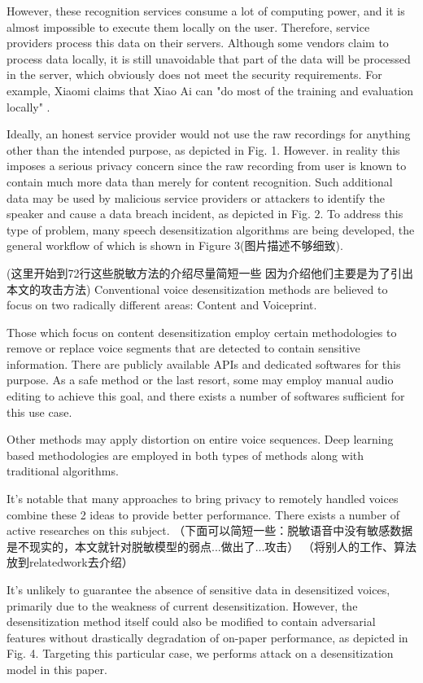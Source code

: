 \documentclass[journal]{IEEEtran} %
\begin{document}
\begin{CJK*}{UTF8}{gbsn}
However, these recognition services consume a lot of computing power, and it is almost impossible to execute them locally on the user. Therefore, service providers process this data on their servers. Although some vendors claim to process data locally, it is still unavoidable that part of the data will be processed in the server, which obviously does not meet the security requirements. For example, Xiaomi claims that Xiao Ai can "do most of the training and evaluation locally" \cite{a20}.


Ideally, an honest service provider would not use the raw recordings for anything other than the intended purpose, as depicted in Fig. 1.
However. in reality this imposes a serious privacy concern since the raw recording from user is known to contain much more data than merely for content recognition. Such additional data may be used by malicious service providers or attackers to identify the speaker and cause a data breach incident, as depicted in Fig. 2. To address this type of problem, many speech desensitization algorithms are being developed, the general workflow of which is shown in Figure 3(图片描述不够细致).


(这里开始到72行这些脱敏方法的介绍尽量简短一些
因为介绍他们主要是为了引出本文的攻击方法)
Conventional voice desensitization methods are believed to focus on two radically different areas: Content and Voiceprint.

Those which focus on content desensitization employ certain methodologies to remove or replace voice segments that are detected to contain sensitive information. There are publicly available APIs\cite{a13} and dedicated softwares for this purpose\cite{a14}. As a safe method or the last resort, some may employ manual audio editing to achieve this goal, and there exists a number of softwares sufficient for this use case\cite{a15}.

Other methods may apply distortion on entire voice sequences. Deep learning based methodologies are employed in both types of methods along with traditional algorithms\cite{a9, a10, a11}.

It's notable that many approaches to bring privacy to remotely handled voices combine these 2 ideas to provide better performance. There exists a number of active researches on this subject\cite{a8}.
（下面可以简短一些：脱敏语音中没有敏感数据是不现实的，本文就针对脱敏模型的弱点...做出了...攻击）
（将别人的工作、算法放到relatedwork去介绍）

It's unlikely to guarantee the absence of sensitive data in desensitized voices, primarily due to the weakness of current desensitization. However, the desensitization method itself could also be modified to contain adversarial features without drastically degradation of on-paper performance\cite{a1}, as depicted in Fig. 4. Targeting this particular case, we performs attack on a desensitization model in this paper.


\end{CJK*}
\end{document}
